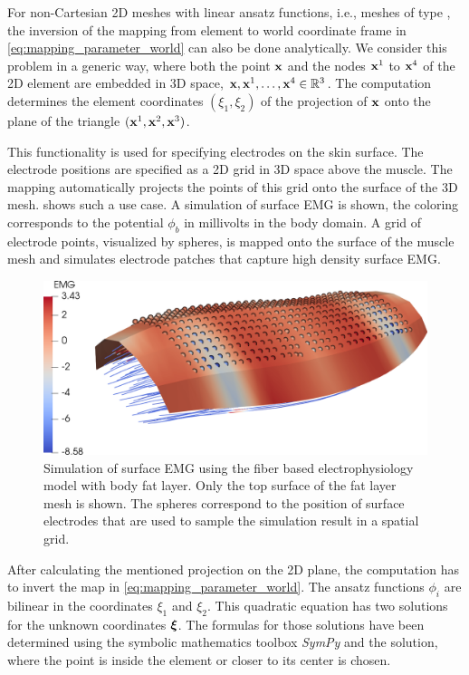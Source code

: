 For non-Cartesian 2D meshes with linear ansatz functions, i.e., meshes of type , the inversion of the mapping from element to world coordinate frame in \cref{eq:mapping_parameter_world} can also be done analytically. We consider this problem in a generic way, where both the point $\textbf{x}$ and the nodes $\textbf{x}^1$ to $\textbf{x}^4$ of the 2D element are embedded in 3D space, $\textbf{x},\textbf{x}^1,\dots,\textbf{x}^4 \in \mathbb{R}^3$. The computation determines the element coordinates $(\xi_1,\xi_2)$ of the projection of $\textbf{x}$ onto the plane of the triangle $(\textbf{x}^1,\textbf{x}^2,\textbf{x}^3)$. 

This functionality is used for specifying electrodes on the skin surface. The electrode positions are specified as a 2D grid in 3D space above the muscle. The mapping automatically projects the points of this grid onto the surface of the 3D mesh.  shows such a use case. A simulation of surface EMG is shown, the coloring corresponds to the potential $\phi_b$ in millivolts in the body domain. A grid of electrode points, visualized by spheres, is mapped onto the surface of the muscle mesh and simulates electrode patches that capture high density surface EMG.

\begin{figure}%
  \centering%
  \includegraphics[width=\textwidth]{images/implementation/electrodes.png}%
  \caption{Simulation of surface EMG using the fiber based electrophysiology model with body fat layer. Only the top surface of the fat layer mesh is shown. The spheres correspond to the position of surface electrodes that are used to sample the simulation result in a spatial grid.}%
  \label{fig:electrodes}%
\end{figure}%

After calculating the mentioned projection on the 2D plane, the computation has to invert the map in \cref{eq:mapping_parameter_world}. The ansatz functions $\phi_i$ are bilinear in the coordinates $\xi_1$ and $\xi_2$. This quadratic equation has two solutions for the unknown coordinates $\boldsymbol{\xi}$. The formulas for those solutions have been determined using the symbolic mathematics toolbox \emph{SymPy} \cite{meurer2017sympy} and the solution, where the point is inside the element or closer to its center is chosen.

